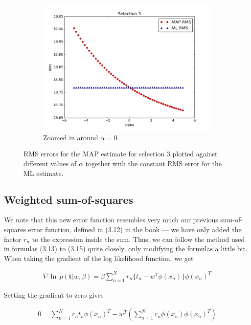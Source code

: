 \documentclass[a4paper]{article}
\begin{document}
\begin{figure}[H]
\begin{adjustwidth}{-7em}{-7em}
    \begin{subfigure}{.32\linewidth}
      \includegraphics[width=\linewidth]{figures/alpha_vs_rms_selection3c.png}
      \caption{Zoomed in around $\alpha = 0$.}
      \label{fig:alpha_vs_rms_selection3c}
    \end{subfigure}
  \end{adjustwidth}
  \caption{RMS errors for the MAP estimate for selection 3 plotted against different values of $\alpha$ together with the constant RMS error for the ML estimate.}
  \label{fig:alpha_vs_rms_selection3}
\end{figure}

\subsection{Weighted sum-of-squares}
We note that this new error function resembles very much our previous sum-of-squares error function, defined in (3.12) in the book --- we have only added the factor $r_n$ to the expression inside the sum. Thus, we can follow the method used in formulas (3.13) to (3.15) quite closely, only modifying the formulas a little bit. When taking the gradient of the log likelihood function, we get

\begin{align*} %
\nabla \operatorname{ln} \, p(\bm{t} | w, \beta) = \beta \sum_{n=1}^{N} r_n \{ t_n - w^T \phi(x_n) \} \phi(x_n)^T
\end{align*}

Setting the gradient to zero gives

\begin{align*} %
0 = \sum_{n=1}^{N} r_n t_n \phi(x_n)^T - w^T \left( \sum_{n=1}^{N} r_n \phi(x_n) \phi(x_n)^T \right)
\end{align*}
\end{document}
